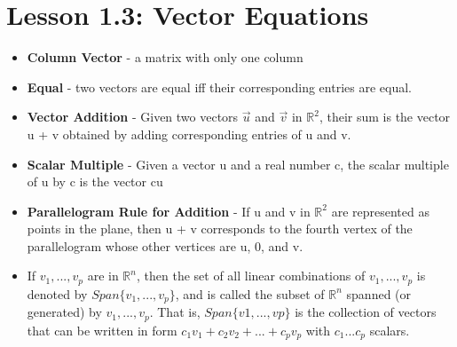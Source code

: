 \documentclass{report}
\newcommand{\Rn}{$\mathbb{R}^n$}
\newcommand{\Rtwo}{$\mathbb{R}^2$}
\begin{document}
\section{Lesson 1.3: Vector Equations}
	\begin{itemize}\addtolength{\leftskip}{2em}
		\item \textbf{Column Vector} - a matrix with only one column 
		\item \textbf{Equal} - two vectors are equal iff their corresponding entries are equal.
		\item \textbf{Vector Addition} - Given two vectors $\vec{u}$ and $\vec{v}$ in $\mathbb{R}^{2}$, their sum is the vector u + v obtained by adding corresponding entries of u and v.
		\item \textbf{Scalar Multiple} - Given a vector u and a real number c, the scalar multiple of u by c is the vector cu
		\item \textbf{Parallelogram Rule for Addition} - If u and v in {\Rtwo} are represented as points in the plane, then u + v corresponds to the fourth vertex of the parallelogram whose other vertices are u, 0, and v.
		\item If $v_1,...,v_p$ are in \Rn, then the set of all linear combinations of $v_1,...,v_p$ is denoted by $Span\{v_1,...,v_p\}$, and is called the subset of {\Rn} spanned (or generated) by $v_1,...,v_p$. That is, $Span\{v1,...,vp\}$ is the collection of vectors that can be written in form
		$c_1v_1+c_2v_2+...+c_pv_p$
			with $c_1...c_p$ scalars.
	\end{itemize}
\end{document}
